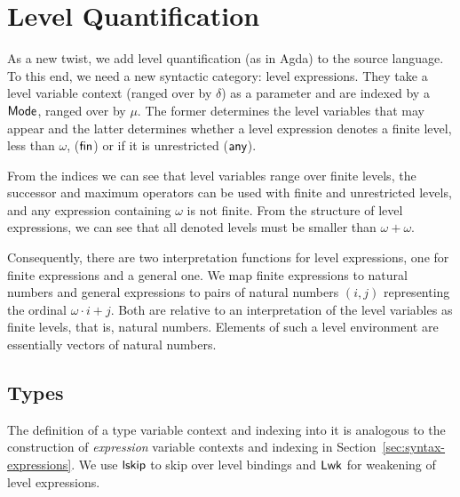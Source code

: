 \documentclass[manuscript,screen,review,anonymous]{acmart}
\begin{document}
\section{Level Quantification}
\label{sec:level-quantification}

As a new twist, we add level quantification (as in Agda) to the source
language. To this end, we need a new syntactic category: level
expressions. They take a level variable context {\IRLEnv} (ranged over
by $\delta$) as a parameter and are
indexed by a $\AMode$, ranged over by $\mu$. The former determines the
level variables that may appear and the latter determines whether a level
expression denotes a finite level, less than $\omega$, ($\Afin$) or if
it is unrestricted ($\Aany$).

\IRLvl

From the indices we can see that level variables range over finite
levels, the successor and maximum operators can be used with finite
and unrestricted levels, and any expression containing $\omega$ is not
finite. From the structure of level expressions, we can see that all
denoted levels must be smaller than $\omega + \omega$. 

Consequently, there are two interpretation functions for level
expressions, one for finite expressions and a general one. We map
finite expressions to natural numbers and general expressions to pairs of natural numbers $(i, j)$
representing the ordinal $\omega\cdot i + j$. 
Both are relative to an interpretation  of the level variables as
finite levels, that is, natural numbers. Elements of such a level
environment are essentially vectors of natural numbers.

\IRLEnvSem

\begin{minipage}{0.45\linewidth}
  \IRLSemFin
\end{minipage}
\begin{minipage}{0.45\linewidth}
  \IRLSemAny
\end{minipage}

\subsection{Types}
\label{sec:types}

The definition of a type variable context and indexing into it is
analogous to the construction of \emph{expression} variable contexts
and indexing in Section~\ref{sec:syntax-expressions}.  We use $\Alskip$ to skip
over level bindings and $\ALwk$ for weakening of level expressions.
\end{document}
